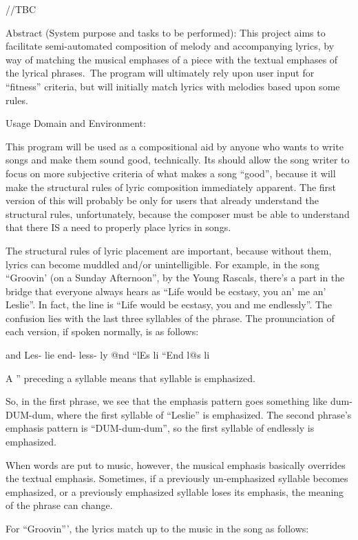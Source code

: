 \documentclass[10pt,oneside]{memoir}
\begin{document}
//TBC


\pagebreak Abstract (System purpose and tasks to be performed):
This project aims to facilitate semi-automated composition of melody and accompanying lyrics, by way of matching the musical emphases of a piece with the textual emphases of the lyrical phrases.~The program will ultimately rely upon user input for ``fitness'' criteria, but will initially match lyrics with melodies based upon some rules.


Usage Domain and Environment:


This program will be used as a compositional aid by anyone who wants to write songs and make them sound good, technically.  Its should allow the song writer to focus on more subjective criteria of what makes a song ``good'', because it will make the structural rules of lyric composition immediately apparent.  The first version of this will probably be only for users that already understand the structural rules, unfortunately, because the composer must be able to understand that there IS a need to properly place lyrics in songs.  


The structural rules of lyric placement are important, because without them, lyrics can become muddled and/or unintelligible. For example, in the song ``Groovin' (on a Sunday Afternoon'', by the Young Rascals, there's a part in the bridge that everyone always hears as ``Life would be ecstasy, you an' me an' Leslie''.  In fact, the line is ``Life would be ecstasy, you and me endlessly''.  The confusion lies with the last three syllables of the phrase.  The pronunciation of each version, if spoken normally, is as follows:


and       Les-   lie
end-       less-       ly
@nd   ``lEs     li
``End      l@s       li


A '' preceding a syllable means that syllable is emphasized. 


So, in the first phrase, we see that the emphasis pattern goes something like dum-DUM-dum, where the first syllable of ``Leslie'' is emphasized.  The second phrase's emphasis pattern is ``DUM-dum-dum'', so the first syllable of endlessly is emphasized.


When words are put to music, however, the musical emphasis basically overrides the textual emphasis. Sometimes, if a previously un-emphasized syllable becomes emphasized, or a previously emphasized syllable loses its emphasis, the meaning of the phrase can change.


For ``Groovin''', the lyrics match up to the music in the song as follows:
\end{document}
